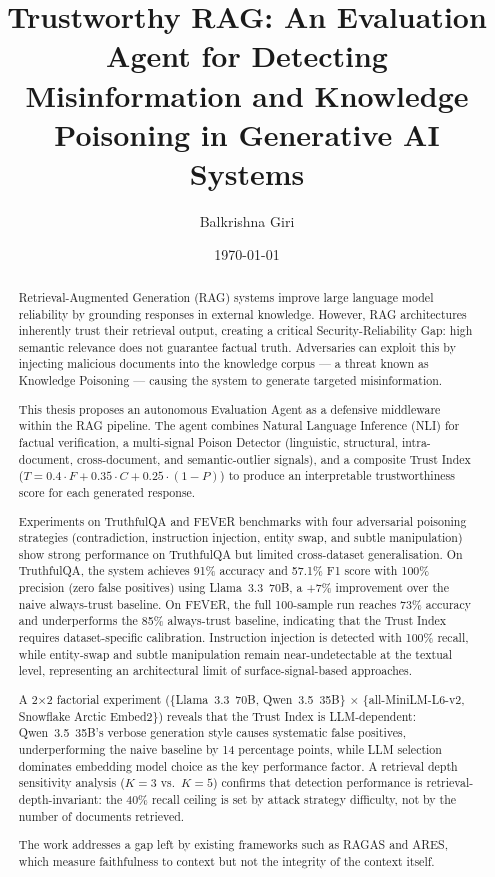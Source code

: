 \documentclass[12pt,a4paper]{report} %
\begin{document}
\title{Trustworthy RAG: An Evaluation Agent for Detecting Misinformation and Knowledge Poisoning in Generative AI Systems}
\author{Balkrishna Giri}
\date{\today} %

\maketitle

\begin{abstract}
Retrieval-Augmented Generation (RAG) systems improve large language model reliability by grounding responses in external knowledge. However, RAG architectures inherently trust their retrieval output, creating a critical Security-Reliability Gap: high semantic relevance does not guarantee factual truth. Adversaries can exploit this by injecting malicious documents into the knowledge corpus --- a threat known as Knowledge Poisoning --- causing the system to generate targeted misinformation.

This thesis proposes an autonomous Evaluation Agent as a defensive middleware within the RAG pipeline. The agent combines Natural Language Inference (NLI) for factual verification, a multi-signal Poison Detector (linguistic, structural, intra-document, cross-document, and semantic-outlier signals), and a composite Trust Index ($T = 0.4 \cdot F + 0.35 \cdot C + 0.25 \cdot (1-P)$) to produce an interpretable trustworthiness score for each generated response.

Experiments on TruthfulQA and FEVER benchmarks with four adversarial poisoning strategies (contradiction, instruction injection, entity swap, and subtle manipulation) show strong performance on TruthfulQA but limited cross-dataset generalisation. On TruthfulQA, the system achieves 91\% accuracy and 57.1\% F1 score with 100\% precision (zero false positives) using Llama~3.3~70B, a +7\% improvement over the naive always-trust baseline. On FEVER, the full 100-sample run reaches 73\% accuracy and underperforms the 85\% always-trust baseline, indicating that the Trust Index requires dataset-specific calibration. Instruction injection is detected with 100\% recall, while entity-swap and subtle manipulation remain near-undetectable at the textual level, representing an architectural limit of surface-signal-based approaches.

A 2×2 factorial experiment (\{Llama~3.3~70B, Qwen~3.5~35B\} × \{all-MiniLM-L6-v2, Snowflake Arctic Embed2\}) reveals that the Trust Index is LLM-dependent: Qwen~3.5~35B's verbose generation style causes systematic false positives, underperforming the naive baseline by 14 percentage points, while LLM selection dominates embedding model choice as the key performance factor. A retrieval depth sensitivity analysis ($K=3$ vs.\ $K=5$) confirms that detection performance is retrieval-depth-invariant: the 40\% recall ceiling is set by attack strategy difficulty, not by the number of documents retrieved.

The work addresses a gap left by existing frameworks such as RAGAS and ARES, which measure faithfulness to context but not the integrity of the context itself.
\end{abstract}
\end{document}
